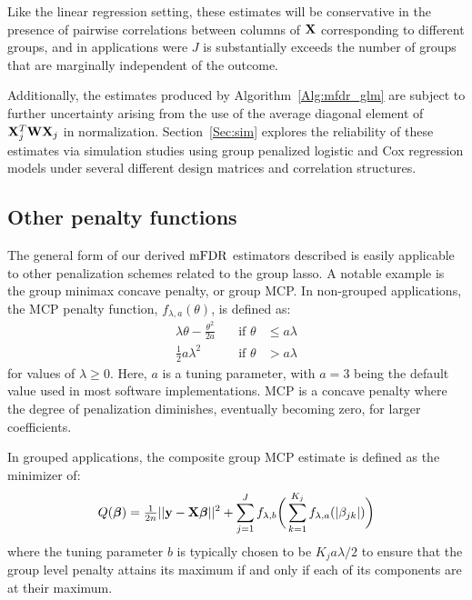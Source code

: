 Like the linear regression setting, these estimates will be conservative in the presence of pairwise correlations between columns of $\mathbf{X}$ corresponding to different groups, and in applications were $J$ is substantially exceeds the number of groups that are marginally independent of the outcome. 

Additionally, the estimates produced by Algorithm~\ref{Alg:mfdr_glm} are subject to further uncertainty arising from the use of the average diagonal element of $\mathbf{X}_j^T\mathbf{W}\mathbf{X}_j$ in normalization. Section~\ref{Sec:sim} explores the reliability of these estimates via simulation studies using group penalized logistic and Cox regression models under several different design matrices and correlation structures.

\subsection{Other penalty functions}

The general form of our derived $\textrm{mFDR}$ estimators described is easily applicable to other penalization schemes related to the group lasso. A notable example is the group minimax concave penalty, or group MCP. In non-grouped applications, the MCP penalty function, $f_{\lambda, a}(\theta)$, is defined as:
\begin{equation}
\label{eq:mcp}
\begin{alignedat}{2}
\lambda\theta - \tfrac{\theta^2}{2a} &\quad \text{if } \theta &\leq a\lambda \\
\tfrac{1}{2}a\lambda^2 &\quad \text{if } \theta &> a\lambda
\end{alignedat}
\end{equation}
for values of $\lambda \geq 0$. Here, $a$ is a tuning parameter, with $a = 3$ being the default value used in most software implementations. MCP is a concave penalty where the degree of penalization diminishes, eventually becoming zero, for larger coefficients. 

In grouped applications, the composite group MCP estimate \citep{Breheny2012, Huang2012} is defined as the minimizer of:
\begin{equation}
Q(\boldsymbol{\beta}) = \tfrac{1}{2n}||\mathbf{y} - \mathbf{X}\boldsymbol{\beta}||^2 + \sum_{j = 1}^{J}f_{\lambda, b}\bigg(\sum_{k=1}^{K_j} f_{\lambda,a}(|\beta_{jk}|)\bigg)
\end{equation}
where the tuning parameter $b$ is typically chosen to be $K_ja\lambda/2$ to ensure that the group level penalty attains its maximum if and only if each of its components are at their maximum.

